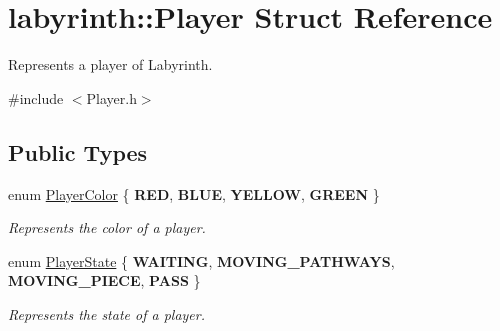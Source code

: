 \hypertarget{structlabyrinth_1_1_player}{}\section{labyrinth\+::Player Struct Reference}
\label{structlabyrinth_1_1_player}


Represents a player of Labyrinth.  




{\ttfamily \#include $<$Player.\+h$>$}

\subsection*{Public Types}
\begin{DoxyCompactItemize}
\item 
\mbox{\label{structlabyrinth_1_1_player_a23119c6cf615f70b86380d07ab692c75}} 
enum \mbox{\hyperlink{structlabyrinth_1_1_player_a23119c6cf615f70b86380d07ab692c75}{Player\+Color}} \{ {\bfseries R\+ED}, 
{\bfseries B\+L\+UE}, 
{\bfseries Y\+E\+L\+L\+OW}, 
{\bfseries G\+R\+E\+EN}
 \}
\begin{DoxyCompactList}\small\item\em Represents the color of a player. \end{DoxyCompactList}\item 
\mbox{\label{structlabyrinth_1_1_player_a55ad4d67aa82ce87e996416c85267e28}} 
enum \mbox{\hyperlink{structlabyrinth_1_1_player_a55ad4d67aa82ce87e996416c85267e28}{Player\+State}} \{ {\bfseries W\+A\+I\+T\+I\+NG}, 
{\bfseries M\+O\+V\+I\+N\+G\+\_\+\+P\+A\+T\+H\+W\+A\+YS}, 
{\bfseries M\+O\+V\+I\+N\+G\+\_\+\+P\+I\+E\+CE}, 
{\bfseries P\+A\+SS}
 \}
\begin{DoxyCompactList}\small\item\em Represents the state of a player. \end{DoxyCompactList}\end{DoxyCompactItemize}
